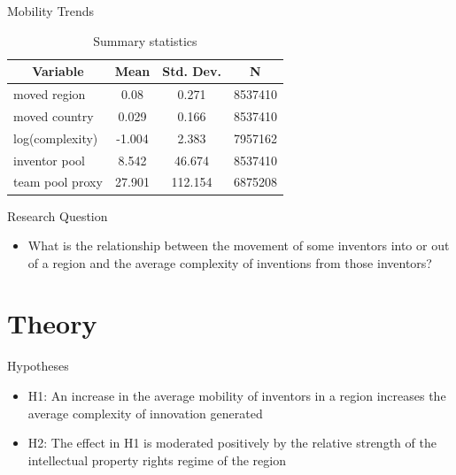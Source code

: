 \documentclass{beamer}
\begin{document}
\begin{frame}{Mobility Trends}

\begin{table}[htbp]\centering \caption{Summary statistics \label{sumstat}}
\begin{tabular}{l c c  c}\hline\hline
\multicolumn{1}{c}{\textbf{Variable}} & \textbf{Mean}
 & \textbf{Std. Dev.} & \textbf{N}\\ \hline
moved region & 0.08 & 0.271  & 8537410\\
moved country & 0.029 & 0.166  & 8537410\\
log(complexity) & -1.004 & 2.383  & 7957162\\
inventor pool & 8.542 & 46.674  & 8537410\\
team pool proxy& 27.901 & 112.154  & 6875208\\
\hline
\end{tabular}
\end{table}

\end{frame}



\begin{frame}{Research Question}{}
\begin{itemize}
\item{What is the relationship between the movement of some inventors into or out of a region and the average complexity of inventions from those inventors?}
\end{itemize}
\end{frame}

\section{Theory}
\begin{frame}{Hypotheses}{}
\begin{itemize}
\item{H1: An increase in the average mobility of inventors in a region increases the average complexity of  innovation generated}
\item{H2: The effect in H1 is moderated positively by the relative strength of the intellectual property rights regime of the region}
\end{itemize}
\end{frame}
\end{document}
